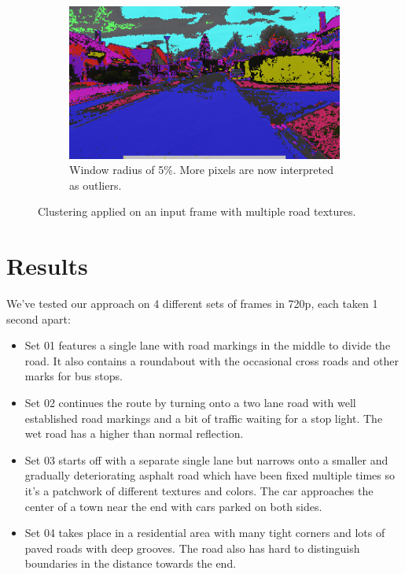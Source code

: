 \documentclass[oneside,english]{llncs}
\begin{document}
\begin{figure}
\begin{subfigure}[t]{0.3\textwidth}
    \end{subfigure}%
    \hfill
    \begin{subfigure}[t]{0.3\textwidth}
        \centering
        \includegraphics[width=1\textwidth]{clustering_scale4_radius_005}
        \caption{Window radius of 5\%. More pixels are now interpreted as outliers.}
        \label{fig:Clustering-window5}
    \end{subfigure}%
\caption{Clustering applied on an input frame with multiple road textures.}
\end{figure}


\section{Results}\label{Results}

We've tested our approach on 4 different sets of frames in 720p, each taken 1 second apart:
\begin{itemize}
    \item{Set 01} features a single lane with road markings in the middle to divide the road. It also contains a roundabout with the occasional cross roads and other marks for bus stops. 
    \item{Set 02} continues the route by turning onto a two lane road with well established road markings and a bit of traffic waiting for a stop light. The wet road has a higher than normal reflection.
    \item{Set 03} starts off with a separate single lane but narrows onto a smaller and gradually deteriorating asphalt road which have been fixed multiple times so it's a patchwork of different textures and colors. The car approaches the center of a town near the end with cars parked on both sides.
    \item{Set 04} takes place in a residential area with many tight corners and lots of paved roads with deep grooves. The road also has hard to distinguish boundaries in the distance towards the end.
\end{itemize}
    
\end{document}
